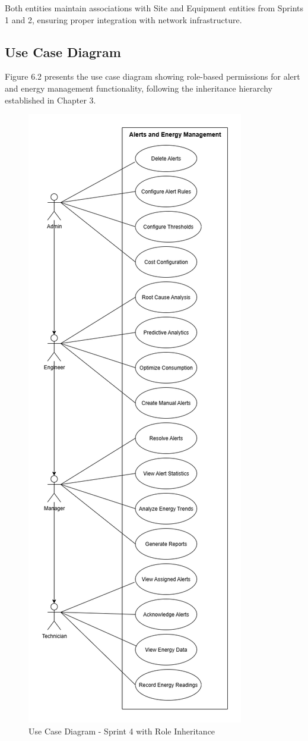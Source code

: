Both entities maintain associations with Site and Equipment entities from Sprints 1 and 2, ensuring proper integration with network infrastructure.

\subsection{Use Case Diagram}

Figure 6.2 presents the use case diagram showing role-based permissions for alert and energy management functionality, following the inheritance hierarchy established in Chapter 3.

\begin{figure}[H]
    \centering
    \includegraphics[width=0.45²\linewidth]{img/chap_06/usecase_diagram_sprint4.png}
    \caption{Use Case Diagram - Sprint 4 with Role Inheritance}
    \label{fig:use_case_diagram_sprint4}
\end{figure}

